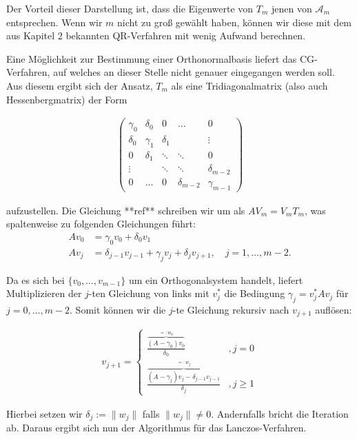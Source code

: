 \documentclass{article}
\begin{document}
\begin{theorem}
Der Vorteil dieser Darstellung ist, dass die Eigenwerte von $T_m$ jenen von $\mathcal{A}_m$ entsprechen. Wenn wir $m$ nicht zu groß gewählt haben, können wir diese mit dem aus Kapitel 2 bekannten QR-Verfahren mit wenig Aufwand berechnen.

Eine Möglichkeit zur Bestimmung einer Orthonormalbasis liefert das CG-Verfahren, auf welches an dieser Stelle nicht genauer eingegangen werden soll. Aus diesem ergibt sich der Ansatz, $T_m$ als eine Tridiagonalmatrix (also auch Hessenbergmatrix) der Form

\begin{align}\label{trimatrix}
\begin{pmatrix}
	\gamma_0 & \delta_0 & 0 & \hdots & 0 \\
	\delta_0 & \gamma_1 & \delta_1 &  & \vdots \\
	0 & \delta_1 & \ddots & \ddots & 0 \\
	\vdots &  & \ddots & \ddots & \delta_{m-2} \\
	0 & \hdots & 0 & \delta_{m-2} & \gamma_{m-1}
\end{pmatrix}
\end{align}

aufzustellen. Die Gleichung **ref** schreiben wir um als $AV_m = V_m T_m$, was spaltenweise zu folgenden Gleichungen führt:
\begin{align*}
	A v_0 &= \gamma_0 v_0 + \delta_0 v_1 \\
	A v_j &= \delta_{j-1} v_{j-1} + \gamma_j v_j + \delta_j v_{j+1}, \quad j=1, \dots, m-2.
\end{align*}

Da es sich bei $\{v_0, \dots, v_{m-1}\}$ um ein Orthogonalsystem handelt, liefert Multiplizieren der $j$-ten Gleichung von links mit $v_j^*$ die Bedingung $\gamma_j = v_j^*Av_j$ für $j = 0, \dots, m-2$. Somit können wir die $j$-te Gleichung rekursiv nach $v_{j+1}$ auflösen:

\begin{align*}
	v_{j+1} = \begin{cases}
		\frac{\overbrace{(A-\gamma_0)v_0}^{=:w_0}}{\delta_0} &,j = 0 \\
		\frac{\overbrace{(A-\gamma_j)v_j - \delta_{j-1} v_{j-1}}^{=:w_j}}{\delta_j} &,j \geq 1
	\end{cases}
\end{align*}

Hierbei setzen wir $\delta_j := \|w_j\|$ falls $\|w_j\| \neq 0$. Andernfalls bricht die Iteration ab. Daraus ergibt sich nun der Algorithmus für das Lanczos-Verfahren.


\end{theorem}
\end{document}
